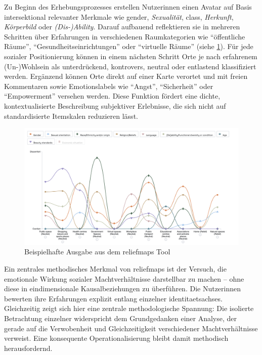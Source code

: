 Zu Beginn des Erhebungsprozesses erstellen Nutzer\genderstern innen einen Avatar auf Basis intersektional relevanter Merkmale wie \gls{gender}, \emph{Sexualität}, \gls{class}, \emph{Herkunft}, \emph{Körperbild} oder \emph{(Dis-)Ability}. Darauf aufbauend reflektieren sie in mehreren Schritten über Erfahrungen in verschiedenen Raumkategorien wie \enquote{öffentliche Räume}, \enquote{Gesundheitseinrichtungen} oder \enquote{virtuelle Räume} (siehe \cref{fig:relief_maps_plus_screenshot_1}). Für jede  sozialer Positionierung können in einem nächsten Schritt Orte je nach erfahrenem (Un\nobreakdash-)Wohlsein als unterdrückend, kontrovers, neutral oder entlastend klassifiziert werden. Ergänzend können Orte direkt auf einer Karte verortet und mit freien Kommentaren sowie Emotionslabels wie \enquote{Angst}, \enquote{Sicherheit} oder \enquote{Empowerment} versehen werden. Diese Funktion fördert eine dichte, kontextualisierte Beschreibung subjektiver Erlebnisse, die sich nicht auf standardisierte Itemskalen reduzieren lässt.

\begin{figure}[htbp]
    \centering
    \includegraphics[width=\textwidth]{Arbeit/Bilder/reliefmap.png}
    \caption{Beispielhafte Ausgabe aus dem \gls{reliefmaps} Tool}
    \label{fig:relief_maps_plus_screenshot_1}
\end{figure}

Ein zentrales methodisches Merkmal von \gls{reliefmaps} ist der Versuch, die emotionale Wirkung sozialer Machtverhältnisse darstellbar zu machen -- ohne diese in eindimensionale Kausalbeziehungen zu überführen. Die Nutzer\genderstern innen bewerten ihre Erfahrungen explizit entlang einzelner \glspl{identitaetsachse}. Gleichzeitig zeigt sich hier eine zentrale methodologische Spannung: Die isolierte Betrachtung einzelner  widerspricht dem Grundgedanken einer  Analyse, der gerade auf die Verwobenheit und Gleichzeitigkeit verschiedener Machtverhältnisse verweist. Eine konsequente  Operationalisierung bleibt damit methodisch herausfordernd.

